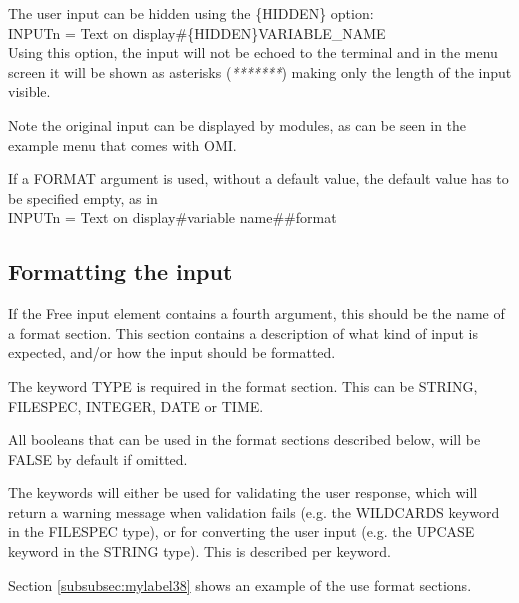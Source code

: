 \documentclass[a4paper]{book}
\newcommand{\vs}{\vspace{3mm}}
\renewcommand{\indent}{\hspace*{5mm}}
\begin{document}
\vs

The user input can be hidden using the \textsf{\{HIDDEN\}} option:\\ 
\indent\textsf{INPUTn = Text on display{\#}\{HIDDEN\}VARIABLE{\_}NAME} \\
Using this option, the input will not be echoed to the terminal and in the menu screen it will be
shown as asterisks (\textsl{*******}) making only the length of the input visible.

Note the original input can be displayed by modules, as can be seen in the example menu that comes with OMI.

\vs

If a FORMAT argument is used, without a default value, the default value has 
to be specified empty, as in \\
\indent\textsf{INPUTn = Text on display{\#}variable name{\#}{\#}format}

\subsection{Formatting the input}
\label{subsubsec:formatting}

If the Free input element contains a fourth argument, this should be the 
name of a format section. This section contains a description of what kind of
input is expected, and/or how the input should be formatted.

\vs

The keyword \textsf{TYPE} is required in the format section. This can be \textsf{STRING}, 
\textsf{FILESPEC}, \textsf{INTEGER}, \textsf{DATE} or \textsf{TIME}.

All booleans that can be used in the format sections described below, will 
be \textsf{FALSE} by default if omitted.

\vs

The keywords will either be used for validating the user response, which 
will return a warning message when validation fails (e.g. the \textsf{WILDCARDS} 
keyword in the \textsf{FILESPEC} type), 
or for converting the user input (e.g. the \textsf{UPCASE} keyword in the \textsf{STRING} 
type). This is described per 
keyword.

Section \ref{subsubsec:mylabel38} shows an example of the use format sections.
\end{document}
